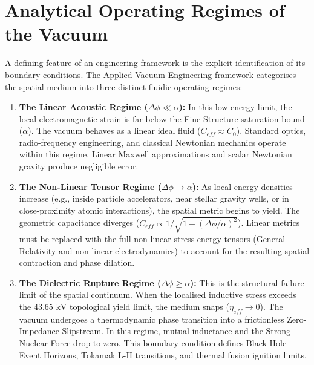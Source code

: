 \section{Analytical Operating Regimes of the Vacuum}

A defining feature of an engineering framework is the explicit identification of its boundary conditions. The Applied Vacuum Engineering framework categorises the spatial medium into three distinct fluidic operating regimes:

\begin{enumerate}
    \item \textbf{The Linear Acoustic Regime ($\Delta\phi \ll \alpha$):} In this low-energy limit, the local electromagnetic strain is far below the Fine-Structure saturation bound ($\alpha$). The vacuum behaves as a linear ideal fluid ($C_{eff} \approx C_0$). Standard optics, radio-frequency engineering, and classical Newtonian mechanics operate within this regime. Linear Maxwell approximations and scalar Newtonian gravity produce negligible error.
    
    \item \textbf{The Non-Linear Tensor Regime ($\Delta\phi \to \alpha$):} As local energy densities increase (e.g., inside particle accelerators, near stellar gravity wells, or in close-proximity atomic interactions), the spatial metric begins to yield. The geometric capacitance diverges ($C_{eff} \propto 1/\sqrt{1 - (\Delta\phi/\alpha)^2}$). Linear metrics must be replaced with the full non-linear stress-energy tensors (General Relativity and non-linear electrodynamics) to account for the resulting spatial contraction and phase dilation.

    \item \textbf{The Dielectric Rupture Regime ($\Delta\phi \ge \alpha$):} This is the structural failure limit of the spatial continuum. When the localised inductive stress exceeds the $43.65\text{ kV}$ topological yield limit, the medium snaps ($\eta_{eff} \to 0$). The vacuum undergoes a thermodynamic phase transition into a frictionless Zero-Impedance Slipstream. In this regime, mutual inductance and the Strong Nuclear Force drop to zero. This boundary condition defines Black Hole Event Horizons, Tokamak L-H transitions, and thermal fusion ignition limits.
\end{enumerate}

